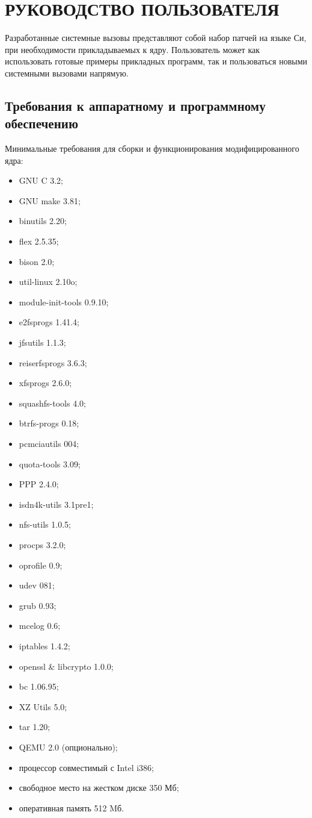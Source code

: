 \section{РУКОВОДСТВО ПОЛЬЗОВАТЕЛЯ}
\label{sec:manual}

Разработанные системные вызовы представляют собой набор патчей на языке Си, при
необходимости прикладываемых к ядру. Пользователь может как использовать готовые
примеры прикладных программ, так и пользоваться новыми системными вызовами
напрямую.

\subsection{Требования к аппаратному и программному обеспечению}

Минимальные требования для сборки и функционирования модифицированного ядра:
\begin{itemize}
\item GNU C 3.2;
\item GNU make 3.81;
\item binutils 2.20;
\item flex 2.5.35;
\item bison 2.0;
\item util-linux 2.10o;
\item module-init-tools 0.9.10;
\item e2fsprogs 1.41.4;
\item jfsutils 1.1.3;
\item reiserfsprogs 3.6.3;
\item xfsprogs 2.6.0;
\item squashfs-tools 4.0;
\item btrfs-progs 0.18;
\item pcmciautils 004;
\item quota-tools 3.09;
\item PPP 2.4.0;
\item isdn4k-utils 3.1pre1;
\item nfs-utils 1.0.5;
\item procps 3.2.0;
\item oprofile 0.9;
\item udev 081;
\item grub 0.93;
\item mcelog 0.6;
\item iptables 1.4.2;
\item openssl \& libcrypto 1.0.0;
\item bc 1.06.95;
\item XZ Utils 5.0;
\item tar 1.20;
\item QEMU 2.0 (опционально);
\item процессор совместимый с Intel i386;
\item свободное место на жестком диске 350 Мб;
\item оперативная память 512 Mб.
\end{itemize}

